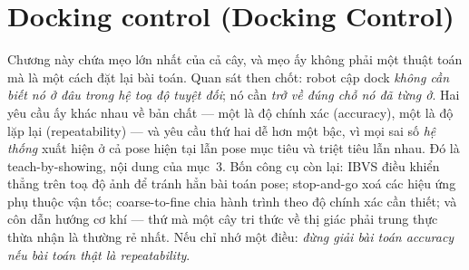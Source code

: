 \documentclass[../../marker.tex]{subfiles}
\begin{document}
\chapter{Docking control (Docking Control)}

\begin{tomtat}
Chương này chứa mẹo lớn nhất của cả cây, và mẹo ấy không phải một thuật toán mà là một cách đặt lại bài toán. Quan sát then chốt: robot cập dock \emph{không cần biết nó ở đâu trong hệ toạ độ tuyệt đối}; nó cần \emph{trở về đúng chỗ nó đã từng ở}. Hai yêu cầu ấy khác nhau về bản chất --- một là độ chính xác (accuracy), một là độ lặp lại (repeatability) --- và yêu cầu thứ hai dễ hơn một bậc, vì mọi sai số \emph{hệ thống} xuất hiện ở cả pose hiện tại lẫn pose mục tiêu và triệt tiêu lẫn nhau. Đó là teach-by-showing, nội dung của mục~3. Bốn công cụ còn lại: IBVS điều khiển thẳng trên toạ độ ảnh để tránh hẳn bài toán pose; stop-and-go xoá các hiệu ứng phụ thuộc vận tốc; coarse-to-fine chia hành trình theo độ chính xác cần thiết; và côn dẫn hướng cơ khí --- thứ mà một cây tri thức về thị giác phải trung thực thừa nhận là thường rẻ nhất. Nếu chỉ nhớ một điều: \emph{đừng giải bài toán accuracy nếu bài toán thật là repeatability}.
\end{tomtat}
\end{document}
